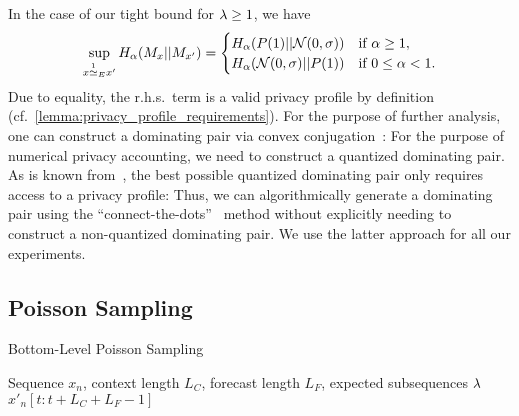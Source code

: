In the case of our tight bound for $\lambda \geq 1$, we have
\begin{equation*}
\sup_{x \overset{1}{\simeq}_{E} x'} H_\alpha(M_x || M_{x'}) = 
\begin{cases}
    H_\alpha(P(1) || \mathcal{N}(0,\sigma)) & \text{if } \alpha \geq 1,\\
    H_\alpha(\mathcal{N}(0,\sigma) || P(1)) & \text{if } 0 \leq \alpha < 1.
\end{cases}
\end{equation*}
Due to equality, the r.h.s.\ term is a valid privacy profile by definition (cf.~\cref{lemma:privacy_profile_requirements}).
For the purpose of further analysis, one can construct a dominating pair via convex conjugation~\cite{zhu2022optimal}:
\dominatingpairfromprofile*
For the purpose of numerical privacy accounting, we need to construct a quantized dominating pair.
As is known from~\cite{doroshenko2022connect}, the best possible quantized dominating pair only requires access to a privacy profile:
\connectthedots*
Thus, we can algorithmically generate a dominating pair using the ``connect-the-dots''~\cite{doroshenko2022connect} method without explicitly needing to construct a non-quantized dominating pair. 
We use the latter approach for all our experiments.


\subsection{Poisson Sampling}\label{appendix:proofs_deterministic_top_poisson_bottom}

\begin{algorithm}
   \caption{Bottom-Level Poisson Sampling}
   \label{algorithm:dp-sgd-poisson-bottom-level}
\begin{algorithmic}
        Sequence $x_n$, context length $L_C$, forecast length $L_F$, expected subsequences $\lambda$
     \hfill {}
     \hfill {}
     \hfill {}
             $x'_n[t : t + L_C +  L_F - 1]$ \hfill {}
        \ENDIF
    \ENDFOR
\end{algorithmic}
\end{algorithm}

